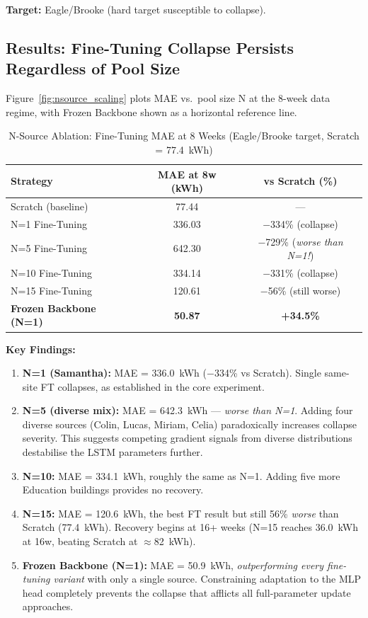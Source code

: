 \documentclass[12pt,a4paper]{report}
\begin{document}
\textbf{Target:} Eagle/Brooke (hard target susceptible to collapse).

\subsection{Results: Fine-Tuning Collapse Persists Regardless of Pool Size}

Figure~\ref{fig:nsource_scaling} plots MAE vs.\ pool size N at the 8-week data regime, with Frozen Backbone shown as a horizontal reference line.

\begin{table}[H]
\centering
\caption{N-Source Ablation: Fine-Tuning MAE at 8 Weeks (Eagle/Brooke target, Scratch = 77.4~kWh)}
\small
\begin{tabular}{lcc}
\toprule
\textbf{Strategy} & \textbf{MAE at 8w (kWh)} & \textbf{vs Scratch (\%)} \\
\midrule
Scratch (baseline) & 77.44 & --- \\
N=1 Fine-Tuning & 336.03 & $-$334\% (collapse) \\
N=5 Fine-Tuning & 642.30 & $-$729\% (\textit{worse than N=1!}) \\
N=10 Fine-Tuning & 334.14 & $-$331\% (collapse) \\
N=15 Fine-Tuning & 120.61 & $-$56\% (still worse) \\
\midrule
\textbf{Frozen Backbone (N=1)} & \textbf{50.87} & \textbf{+34.5\%} \\
\bottomrule
\end{tabular}
\end{table}

\textbf{Key Findings:}

\begin{enumerate}
    \item \textbf{N=1 (Samantha):} MAE = 336.0~kWh ($-$334\% vs Scratch). Single same-site FT collapses, as established in the core experiment.

    \item \textbf{N=5 (diverse mix):} MAE = 642.3~kWh --- \textit{worse than N=1}. Adding four diverse sources (Colin, Lucas, Miriam, Celia) paradoxically increases collapse severity. This suggests competing gradient signals from diverse distributions destabilise the LSTM parameters further.

    \item \textbf{N=10:} MAE = 334.1~kWh, roughly the same as N=1. Adding five more Education buildings provides no recovery.

    \item \textbf{N=15:} MAE = 120.6~kWh, the best FT result but still 56\% \textit{worse} than Scratch (77.4~kWh). Recovery begins at 16+ weeks (N=15 reaches 36.0~kWh at 16w, beating Scratch at $\approx$82~kWh).

    \item \textbf{Frozen Backbone (N=1):} MAE = 50.9~kWh, \textit{outperforming every fine-tuning variant} with only a single source. Constraining adaptation to the MLP head completely prevents the collapse that afflicts all full-parameter update approaches.
\end{enumerate}
\end{document}
